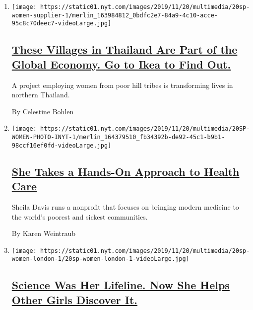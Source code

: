 \begin{enumerate}
\def\labelenumi{\arabic{enumi}.}
\item
  \texttt{[image: https://static01.nyt.com/images/2019/11/20/multimedia/20sp-women-supplier-1/merlin\_163984812\_0bdfc2e7-84a9-4c10-acce-95c8c70deec7-videoLarge.jpg]}

  \hypertarget{these-villages-in-thailand-are-part-of-the-global-economy-go-to-ikea-to-find-out}{%
  \subsection{\texorpdfstring{\href{/2019/11/19/business/thailand-doi-tung-women.html}{These
  Villages in Thailand Are Part of the Global Economy. Go to Ikea to
  Find
  Out.}}{These Villages in Thailand Are Part of the Global Economy. Go to Ikea to Find Out.}}\label{these-villages-in-thailand-are-part-of-the-global-economy-go-to-ikea-to-find-out}}

  A project employing women from poor hill tribes is transforming lives
  in northern Thailand.

  By Celestine Bohlen
\item
  \texttt{[image: https://static01.nyt.com/images/2019/11/20/multimedia/20SP-WOMEN-PHOTO-INYT-1/merlin\_164379510\_fb34392b-de92-45c1-b9b1-98ccf16ef0fd-videoLarge.jpg]}

  \hypertarget{she-takes-a-hands-on-approach-to-health-care}{%
  \subsection{\texorpdfstring{\href{/2019/11/19/health/sheila-davis-health-care-access.html}{She
  Takes a Hands-On Approach to Health
  Care}}{She Takes a Hands-On Approach to Health Care}}\label{she-takes-a-hands-on-approach-to-health-care}}

  Sheila Davis runs a nonprofit that focuses on bringing modern medicine
  to the world's poorest and sickest communities.

  By Karen Weintraub
\item
  \texttt{[image: https://static01.nyt.com/images/2019/11/20/multimedia/20sp-women-london-1/20sp-women-london-1-videoLarge.jpg]}

  \hypertarget{science-was-her-lifeline-now-she-helps-other-girls-discover-it}{%
  \subsection{\texorpdfstring{\href{/2019/11/19/science/stem-sabina-london.html}{Science
  Was Her Lifeline. Now She Helps Other Girls Discover
  It.}}{Science Was Her Lifeline. Now She Helps Other Girls Discover It.}}\label{science-was-her-lifeline-now-she-helps-other-girls-discover-it}}


\end{enumerate}
